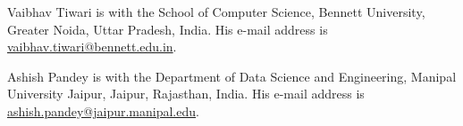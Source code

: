 \documentclass[10pt,journal,compsoc]{IEEEtran}
\begin{document}
\begin{IEEEbiographynophoto}{Vaibhav Tiwari}
is with the School of Computer Science, Bennett University, Greater Noida,
Uttar Pradesh, India. His e-mail address is
\href{mailto:vaibhav.tiwari@bennett.edu.in}{vaibhav.tiwari@bennett.edu.in}.
\end{IEEEbiographynophoto}

\begin{IEEEbiographynophoto}{Ashish Pandey}
is with the Department of Data Science and Engineering, Manipal University
Jaipur, Jaipur, Rajasthan, India. His e-mail address is
\href{mailto:ashish.pandey@jaipur.manipal.edu}{ashish.pandey@jaipur.manipal.edu}.
\end{IEEEbiographynophoto}
\end{document}
